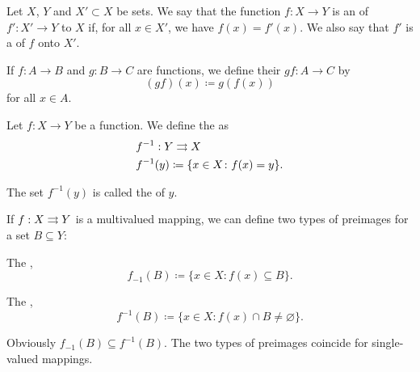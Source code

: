 \begin{definition}\label{def:function_extension}
  Let \( X \), \( Y \) and \( X' \subset X \) be sets. We say that the function \( f: X \to Y \) is an  of \( f': X' \to Y \) to \( X \) if, for all \( x \in X' \), we have \( f(x) = f'(x) \). We also say that \( f' \) is a  of \( f \) onto \( X' \).
\end{definition}

\begin{definition}\label{def:function_composition}
  If \( f: A \to B \) and \( g: B \to C \) are functions, we define their  \( gf: A \to C \) by
  \begin{equation*}
    (gf)(x) \coloneqq g(f(x))
  \end{equation*}
  for all \( x \in A \).
\end{definition}

\begin{definition}\label{def:function_preimage}
  Let \( f: X \to Y \) be a function. We define the  as
  \begin{align*}
    &f^{-1} : Y \rightrightarrows X \\
    &f^{-1}(y) \coloneqq \{ x \in X \colon f(x) = y \}.
  \end{align*}

  The set \( f^{-1}(y) \) is called the  of \( y \).

  If \( f : X \rightrightarrows Y \) is a multivalued mapping, we can define two types of preimages for a set \( B \subseteq Y \):
  \begin{defenum}
    \item The ,
    \begin{equation*}
      f_{-1}(B) \coloneqq \{ x \in X \colon f(x) \subseteq B \}.
    \end{equation*}

    \item The ,
    \begin{equation*}
      f^{-1}(B) \coloneqq \{ x \in X \colon f(x) \cap B \neq \varnothing \}.
    \end{equation*}
  \end{defenum}

  Obviously \( f_{-1}(B) \subseteq f^{-1}(B) \). The two types of preimages coincide for single-valued mappings.
\end{definition}

